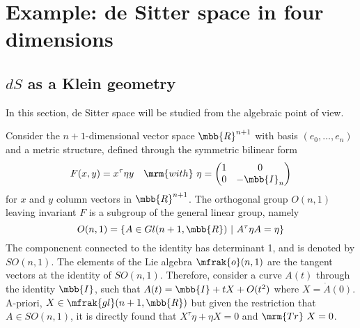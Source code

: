 \documentclass[11pt]{article}
\begin{document}
\section{Example: de Sitter space in four dimensions}

\subsection{$dS$ as a Klein geometry}

In this section, de Sitter space will be studied from the 
algebraic point of view.

Consider the $n+1$-dimensional vector space $\mbb{R}^{n+1}$ with 
basis $(e_0,\ldots,e_n)$ and a metric structure, defined through 
the symmetric bilinear form
\begin{equation}
	F(x,y) = x^\tau \eta y
	\quad\mrm{with}~
	\eta =
	\begin{pmatrix}
		1 & 0 \\
		0 & -\mbb{I}_n
	\end{pmatrix}
\end{equation}
for $x$ and $y$ column vectors in $\mbb{R}^{n+1}$.
The orthogonal group $O(n,1)$ leaving invariant $F$ is a subgroup 
of the general linear group, namely
%
\begin{equation}
	O(n,1) = \{ A \in Gl(n+1,\mbb{R})~|~ A^\tau \eta A = \eta\}
\end{equation}
The componenent connected to the identity has determinant 1, and 
is denoted by $SO(n,1)$.  The elements of the Lie algebra 
$\mfrak{o}(n,1)$ are the tangent vectors at the identity of 
$SO(n,1)$. Therefore, consider a curve $A(t)$ through the 
identity $\mbb{I}$, such that $A(t) = \mbb{I} + tX + O(t^2)$ 
where $X = \dot{A}(0)$. A-priori, $X \in \mfrak{gl}(n+1,\mbb{R})$ 
but given the restriction that $A \in SO(n,1)$, it is directly 
found that  $X^\tau \eta + \eta X = 0$ and $\mrm{Tr}~X = 0$.
\end{document}
